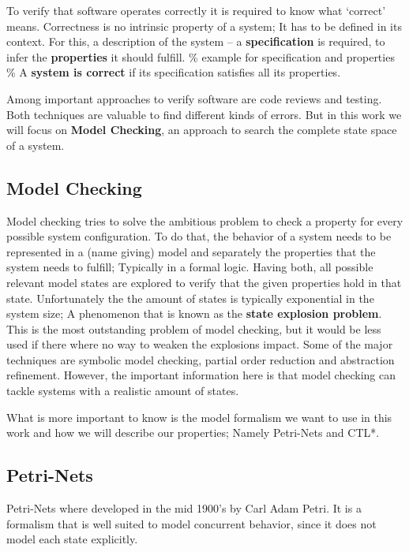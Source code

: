 To verify that software operates correctly it is required to know what `correct' means.
Correctness is no intrinsic property of a system;
It has to be defined in its context.
For this, a description of the system -- a \textbf{specification} is required, to infer the \textbf{properties} it should fulfill.
\% example for specification and properties \%
A \textbf{system is correct} if its specification satisfies all its properties\cite[Chapter 1]{baier2008principles}.

Among important approaches to verify software are code reviews and testing.
Both techniques are valuable to find different kinds of errors.
But in this work we will focus on \textbf{Model Checking}, an approach to search the complete state space of a system.

\subsection{Model Checking}
Model checking tries to solve the ambitious problem to check a property for every possible system configuration.
To do that, the behavior of a system needs to be represented in a (name giving) model
and separately the properties that the system needs to fulfill;
Typically in a formal logic.
Having both, all possible relevant model states are explored to verify that the given properties hold in that state.
Unfortunately the the amount of states is typically exponential in the system size;
A phenomenon that is known as the \textbf{state explosion problem}\cite[Introduction]{mcmillan1993symbolic}.
This is the most outstanding problem of model checking, but it would be less used if there where no way to weaken the explosions impact.
Some of the major techniques are symbolic model checking, partial order reduction and abstraction refinement\cite[Chapter 5]{clarke2011model}.
However, the important information here is that model checking can tackle systems with a realistic amount of states.

What is more important to know is the model formalism we want to use in this work and how we will describe our properties; Namely Petri-Nets and CTL*.

\subsection{Petri-Nets}
\label{rel_petri}
Petri-Nets where developed in the mid 1900's by Carl Adam Petri\cite{petri1962kommunikation}.
It is a formalism that is well suited to model concurrent behavior, since it does not model each state explicitly.

